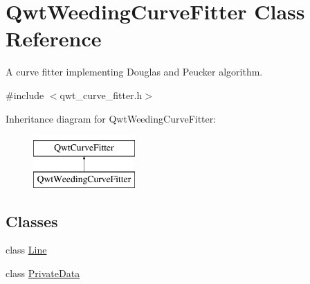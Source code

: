 \hypertarget{class_qwt_weeding_curve_fitter}{\section{Qwt\-Weeding\-Curve\-Fitter Class Reference}
\label{class_qwt_weeding_curve_fitter}
}


A curve fitter implementing Douglas and Peucker algorithm.  




{\ttfamily \#include $<$qwt\-\_\-curve\-\_\-fitter.\-h$>$}

Inheritance diagram for Qwt\-Weeding\-Curve\-Fitter\-:\begin{figure}[H]
\begin{center}
\leavevmode
\includegraphics[height=2.000000cm]{class_qwt_weeding_curve_fitter}
\end{center}
\end{figure}
\subsection*{Classes}
\begin{DoxyCompactItemize}
\item 
class \hyperlink{class_qwt_weeding_curve_fitter_1_1_line}{Line}
\item 
class \hyperlink{class_qwt_weeding_curve_fitter_1_1_private_data}{Private\-Data}
\end{DoxyCompactItemize}
